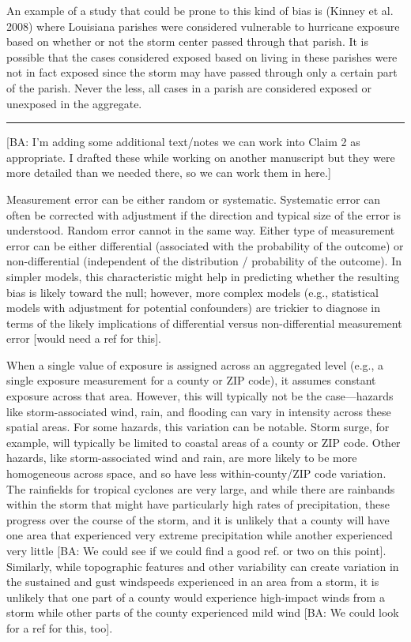 \documentclass[]{article}
\begin{document}
An example of a study that could be prone to this kind of bias is
(Kinney et al. 2008) where Louisiana parishes were considered vulnerable
to hurricane exposure based on whether or not the storm center passed
through that parish. It is possible that the cases considered exposed
based on living in these parishes were not in fact exposed since the
storm may have passed through only a certain part of the parish. Never
the less, all cases in a parish are considered exposed or unexposed in
the aggregate.

\begin{center}\rule{0.5\linewidth}{0.5pt}\end{center}

{[}BA: I'm adding some additional text/notes we can work into Claim 2 as
appropriate. I drafted these while working on another manuscript but
they were more detailed than we needed there, so we can work them in
here.{]}

Measurement error can be either random or systematic. Systematic error
can often be corrected with adjustment if the direction and typical size
of the error is understood. Random error cannot in the same way. Either
type of measurement error can be either differential (associated with
the probability of the outcome) or non-differential (independent of the
distribution / probability of the outcome). In simpler models, this
characteristic might help in predicting whether the resulting bias is
likely toward the null; however, more complex models (e.g., statistical
models with adjustment for potential confounders) are trickier to
diagnose in terms of the likely implications of differential versus
non-differential measurement error {[}would need a ref for this{]}.

When a single value of exposure is assigned across an aggregated level
(e.g., a single exposure measurement for a county or ZIP code), it
assumes constant exposure across that area. However, this will typically
not be the case---hazards like storm-associated wind, rain, and flooding
can vary in intensity across these spatial areas. For some hazards, this
variation can be notable. Storm surge, for example, will typically be
limited to coastal areas of a county or ZIP code. Other hazards, like
storm-associated wind and rain, are more likely to be more homogeneous
across space, and so have less within-county/ZIP code variation. The
rainfields for tropical cyclones are very large, and while there are
rainbands within the storm that might have particularly high rates of
precipitation, these progress over the course of the storm, and it is
unlikely that a county will have one area that experienced very extreme
precipitation while another experienced very little {[}BA: We could see
if we could find a good ref. or two on this point{]}. Similarly, while
topographic features and other variability can create variation in the
sustained and gust windspeeds experienced in an area from a storm, it is
unlikely that one part of a county would experience high-impact winds
from a storm while other parts of the county experienced mild wind
{[}BA: We could look for a ref for this, too{]}.
\end{document}
